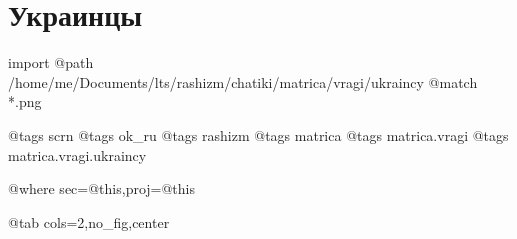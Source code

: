  
 
 
 
 

\section{Украинцы}

\ifcmt
  import
    @path /home/me/Documents/lts/rashizm/chatiki/matrica/vragi/ukraincy
    @match *.png

    @tags scrn
    @tags ok_ru
    @tags rashizm
    @tags matrica
    @tags matrica.vragi
    @tags matrica.vragi.ukraincy

    @where sec=@this,proj=@this
  
    @tab cols=2,no_fig,center
\fi

